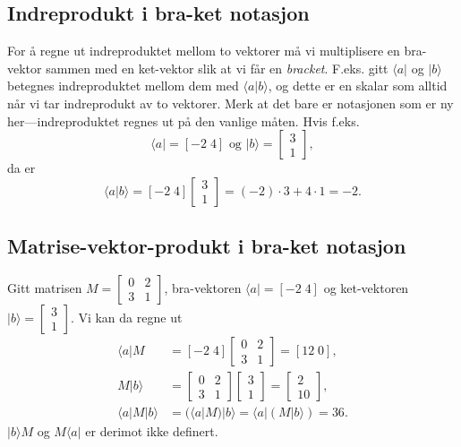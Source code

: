 \subsection{Indreprodukt i bra-ket notasjon}
For å regne ut indreproduktet mellom to vektorer må vi multiplisere en bra-vektor sammen med en ket-vektor slik at vi får en \emph{bracket}. F.eks. gitt $\langle a|$ og $|b\rangle$ betegnes indreproduktet mellom dem med $\langle a|b\rangle$, og dette er en skalar som alltid når vi tar indreprodukt av to vektorer. Merk at det bare er notasjonen som er ny her---indreproduktet regnes ut på den vanlige måten. Hvis f.eks.
\begin{displaymath}
	\langle a | =  [-2\; 4] \text{ og }  |b\rangle =  \left[\begin{array}{c} 3 \\ 1 \end{array}\right],
\end{displaymath}
da er
\begin{displaymath}
\langle a|b\rangle =  [-2\; 4]  \left[\begin{array}{c} 3 \\ 1 \end{array}\right] = (-2)\cdot3 +  4\cdot 1 = -2.
\end{displaymath}

\subsection{Matrise-vektor-produkt i bra-ket notasjon}
Gitt matrisen $M = \left[\begin{array}{cc} 0 & 2 \\ 3 & 1\end{array}\right]$, bra-vektoren $\langle a|=  [-2\; 4]$ og ket-vektoren  $|b\rangle =  \left[\begin{array}{c} 3 \\ 1 \end{array}\right]$. Vi kan da regne ut 
\begin{align*}
	\langle a|M &= [-2 \; 4] \left[\begin{array}{cc} 0 & 2 \\ 3 & 1\end{array}\right] = [12\; 0], \\
	M|b\rangle &=  \left[\begin{array}{cc} 0 & 2 \\ 3 & 1\end{array}\right]\left[\begin{array}{c} 3 \\ 1 \end{array}\right] = \left[\begin{array}{r}  2\\ 10  \end{array}\right], \\
	\langle a|M|b\rangle &= (\langle a|M)|b\rangle = \langle a|(M|b\rangle) =  36.
\end{align*}
$|b\rangle M$ og $M\langle a|$ er derimot ikke definert.

